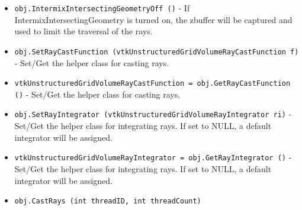 \begin{itemize}
\item  \verb|obj.IntermixIntersectingGeometryOff ()| -  If IntermixIntersectingGeometry is turned on, the zbuffer will be
 captured and used to limit the traversal of the rays.

\item  \verb|obj.SetRayCastFunction (vtkUnstructuredGridVolumeRayCastFunction f)| -  Set/Get the helper class for casting rays.

\item  \verb|vtkUnstructuredGridVolumeRayCastFunction = obj.GetRayCastFunction ()| -  Set/Get the helper class for casting rays.

\item  \verb|obj.SetRayIntegrator (vtkUnstructuredGridVolumeRayIntegrator ri)| -  Set/Get the helper class for integrating rays.  If set to NULL, a
 default integrator will be assigned.

\item  \verb|vtkUnstructuredGridVolumeRayIntegrator = obj.GetRayIntegrator ()| -  Set/Get the helper class for integrating rays.  If set to NULL, a
 default integrator will be assigned.

\item  \verb|obj.CastRays (int threadID, int threadCount)|

\end{itemize}
